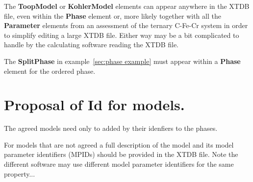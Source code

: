\documentclass{article}
\begin{document}
\begin{appendices}
The {\bf ToopModel} or {\bf KohlerModel} elements can appear anywhere
in the XTDB file, even within the {\bf Phase} element or, more likely
together with all the {\bf Parameter} elements from an assessment of
the ternary C-Fe-Cr system in order to simplify editing a large XTDB
file.  Either way may be a bit complicated to handle by the
calculating software reading the XTDB file.

The {\bf SplitPhase} in example~\ref{sec:phase example} must appear
within a {\bf Phase} element for the ordered phase.


\newpage 

\section{Proposal of Id for models.}\label{sec:modelapp}

The agreed models need only to added by their idenfiers to the phases.

For models that are not agreed a full description of the model and its
model parameter identifiers (MPIDs) should be provided in the XTDB
file.  Note the different software may use different model parameter
identifiers for the same property...


\end{appendices}
\end{document}

